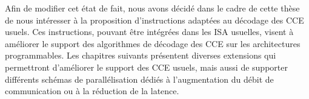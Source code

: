 \documentclass[../main.tex]{subfiles}
\begin{document}
Afin de modifier cet état de fait, nous avons décidé dans le cadre de cette thèse de nous intéresser à la proposition d'instructions adaptées au décodage des CCE usuels. Ces instructions, pouvant être intégrées dans les ISA usuelles, visent à améliorer le support des algorithmes de décodage des CCE sur les architectures programmables. Les chapitres suivants présentent diverses extensions qui permettront d'améliorer le support des CCE usuels, mais aussi de supporter différents schémas de parallélisation dédiés à l'augmentation du débit de communication ou à la réduction de la latence.
\end{document}
